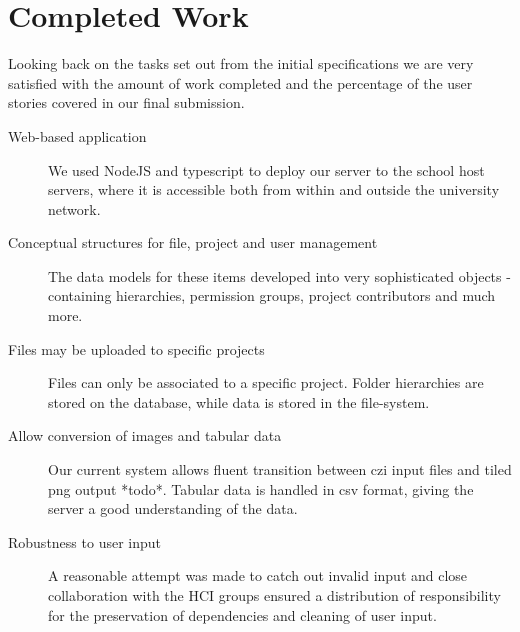 \section{Completed Work}
Looking back on the tasks set out from the initial specifications we are very satisfied with the amount of work completed and the percentage of the user stories covered in our final submission.
\begin{description}
\item[Web-based application] We used NodeJS and typescript to deploy our server to the school host servers, where it is accessible both from within and outside the university network.
\item[Conceptual structures for file, project and user management] The data models for these items developed into very sophisticated objects - containing hierarchies, permission groups, project contributors and much more.
\item[Files may be uploaded to specific projects] Files can only be associated to a specific project. Folder hierarchies are stored on the database, while data is stored in the file-system.
\item[Allow conversion of images and tabular data] Our current system allows fluent transition between czi input files and tiled png output *todo*. Tabular data is handled in csv format, giving the server a good understanding of the data.
\item[Robustness to user input] A reasonable attempt was made to catch out invalid input and close collaboration with the HCI groups ensured a distribution of responsibility for the preservation of dependencies and cleaning of user input.
\end{description}